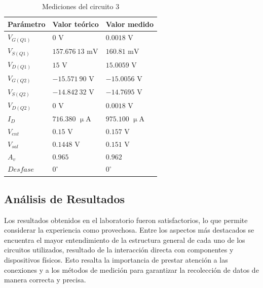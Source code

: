 \documentclass[journal]{IEEEtran}
\begin{document}
\begin{table}[H]
        \renewcommand{\arraystretch}{1.5}
        \caption{Mediciones del circuito 3}
        \centering
        \begin{tabular}{ >{\centering\arraybackslash}m{2.5cm} >{\centering\arraybackslash}m{2.5cm} >{\centering\arraybackslash}m{2.5cm} }
                \hline
            Parámetro & Valor teórico & Valor medido\\ 
            \hline
            $V_{G(Q1)}$ & $0$ $\mathrm{V}$ & $0.0018$ $\mathrm{V}$ \\ 
            $V_{S(Q1)}$ & $157.676~13$ $\mathrm{mV}$ & $160.81$ $\mathrm{mV}$ \\
            $V_{D(Q1)}$ & $15$ $\mathrm{V}$ & $15.0059$ $\mathrm{V}$ \\
            $V_{G(Q2)}$ & $-15.571~90$ $\mathrm{V}$ & $-15.0056$ $\mathrm{V}$ \\ 
            $V_{S(Q2)}$ & $-14.842~32$ $\mathrm{V}$ & $-14.7695$ $\mathrm{V}$ \\ 
            $V_{D(Q2)}$ & $0$ $\mathrm{V}$ & $0.0018$ $\mathrm{V}$ \\ 
            $I_D$ & $716.380$ $\upmu\mathrm{A}$ & $975.100$ $\upmu\mathrm{A}$ \\
            $V_{ent}$ & $0.15$ $\mathrm{V}$ & $0.157$ $\mathrm{V}$ \\ 
            $V_{sal}$ & $0.1448$ $\mathrm{V}$ & $0.151$ $\mathrm{V}$ \\
            $A_v$ & $0.965$ & $0.962$ \\
            $Desfase$ & $0^{\circ}$  & $0^{\circ}$ \\
            \hline
        \end{tabular}
        \label{tabla8}
    \end{table}

\subsection{Análisis de Resultados}
Los resultados obtenidos en el laboratorio fueron satisfactorios, lo que permite considerar la experiencia como provechosa. 
Entre los aspectos más destacados se encuentra el mayor entendimiento de la estructura general de cada uno de los circuitos utilizados, 
resultado de la interacción directa con componentes y dispositivos físicos. Esto resalta la importancia de prestar atención a las conexiones y a los 
métodos de medición para garantizar la recolección de datos de manera correcta y precisa.
\end{document}
